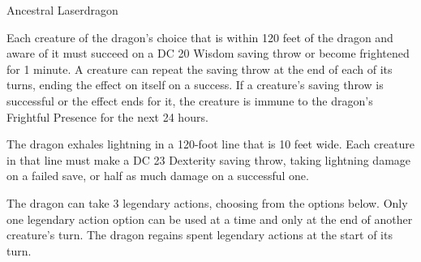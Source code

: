 \begin{DndMonster}[width=0.5\textwidth]{Ancestral Laserdragon}
	\DndMonsterAttack[
		name			= Tail,
		distance		= melee,	%
		mod				= +16,
		reach			= 20,
		targets			= one target,
		dmg				= \DndDice{2d8 + 9},
		dmg-type		= Bludgeoning,
	]
	
	Each creature of the dragon's choice that is within 120 feet of the dragon and aware of it must succeed on a DC 20 Wisdom saving throw or become frightened for 1 minute. A creature can repeat the saving throw at the end of each of its turns, ending the effect on itself on a success. If a creature's saving throw is successful or the effect ends for it, the creature is immune to the dragon's Frightful Presence for the next 24 hours.
	
	The dragon exhales lightning in a 120-­foot line that is 10 feet wide. Each creature in that line must make a DC 23 Dexterity saving throw, taking  lightning damage on a failed save, or half as much damage on a successful one.
	
	The dragon can take 3 legendary actions, choosing from the options below. Only one legendary action option can be used at a time and only at the end of another creature's turn. The dragon regains spent legendary actions at the start of its turn.
	\begin{DndMonsterLegendaryActions}
	\end{DndMonsterLegendaryActions}
\end{DndMonster}